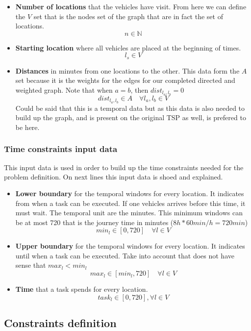\documentclass[]{report}
\begin{document}
\begin{itemize}
	\item \textbf{Number of locations} that the vehicles have visit. From here we can define the $V$ set that is the nodes set of the graph that are in fact the set of locations.
	$$
	n \in \mathbb{N}
	$$ 
	\item \textbf{Starting location} where all vehicles are placed at the beginning of times.
	$$
	l_{s} \in V
	$$
	\item \textbf{Distances} in minutes from one locations to the other. This data form the $A$ set because it is the weights for the edges for our completed directed and weighted graph. Note that when $a=b$, then $dist_{l_{a},l_{b}}=0$
	$$
	dist_{l_{a},l_{b}} \in A \quad \forall l_{a},l_{b} \in V
	$$
	Could be said that this is a temporal data but as this data is also needed to build up the graph, and is present on the original TSP as well, is prefered to be here.
\end{itemize}

\subsubsection{Time constraints input data}
This input data is used in order to build up the time constraints needed for the problem definition. On next lines this input data is shoed and explained.

\begin{itemize}	
	\item \textbf{Lower boundary} for the temporal windows for every location. It indicates from when a task can be executed. If one vehicles arrives before this time, it must wait. The temporal unit are the minutes. This minimum windows can be at most 720 that is the journey time in minutes ($8h*60min/h = 720min$)
	$$
	min_{l} \in [0, 720] \quad \forall l \in V
	$$
	\item \textbf{Upper boundary} for the temporal windows for every location. It indicates until when a task can be executed. Take into account that does not have sense that $max_{l} < min_{l}$
	$$
	max_{l} \in [min_{l}, 720] \quad \forall l \in V
	$$
	\item \textbf{Time} that a task spends for every location.
	$$
	task_{l} \in [0, 720], \forall l \in V
	$$
\end{itemize}

\subsection{Constraints definition}\label{ss:formal_constraints_definition}
\end{document}
